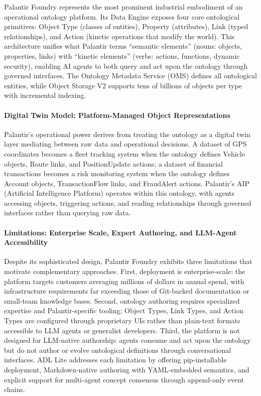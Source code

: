 Palantir Foundry represents the most prominent industrial embodiment of an operational ontology platform. Its Data Engine exposes four core ontological primitives: Object Type (classes of entities), Property (attributes), Link (typed relationships), and Action (kinetic operations that modify the world)\cite{ref19}. This architecture unifies what Palantir terms ``semantic elements'' (nouns: objects, properties, links) with ``kinetic elements'' (verbs: actions, functions, dynamic security), enabling AI agents to both query and act upon the ontology through governed interfaces\cite{ref20}. The Ontology Metadata Service (OMS) defines all ontological entities, while Object Storage V2 supports tens of billions of objects per type with incremental indexing\cite{ref21}.

\paragraph{Digital Twin Model: Platform-Managed Object Representations}\label{digital-twin-model-platform-managed-object-representations}

Palantir's operational power derives from treating the ontology as a digital twin layer mediating between raw data and operational decisions\cite{ref21}. A dataset of GPS coordinates becomes a fleet tracking system when the ontology defines Vehicle objects, Route links, and PositionUpdate actions; a dataset of financial transactions becomes a risk monitoring system when the ontology defines Account objects, TransactionFlow links, and FraudAlert actions\cite{ref22}. Palantir's AIP (Artificial Intelligence Platform) operates within this ontology, with agents accessing objects, triggering actions, and reading relationships through governed interfaces rather than querying raw data\cite{ref21}.

\paragraph{Limitations: Enterprise Scale, Expert Authoring, and LLM-Agent Accessibility}\label{limitations-enterprise-scale-expert-authoring-and-llm-agent-accessibility}

Despite its sophisticated design, Palantir Foundry exhibits three limitations that motivate complementary approaches. First, deployment is enterprise-scale: the platform targets customers averaging millions of dollars in annual spend, with infrastructure requirements far exceeding those of Git-backed documentation or small-team knowledge bases\cite{ref19}. Second, ontology authoring requires specialized expertise and Palantir-specific tooling; Object Types, Link Types, and Action Types are configured through proprietary UIs rather than plain-text formats accessible to LLM agents or generalist developers\cite{ref20}. Third, the platform is not designed for LLM-native authorship: agents consume and act upon the ontology but do not author or evolve ontological definitions through conversational interfaces. ADL Lite addresses each limitation by offering pip-installable deployment, Markdown-native authoring with YAML-embedded semantics, and explicit support for multi-agent concept consensus through append-only event chains.

